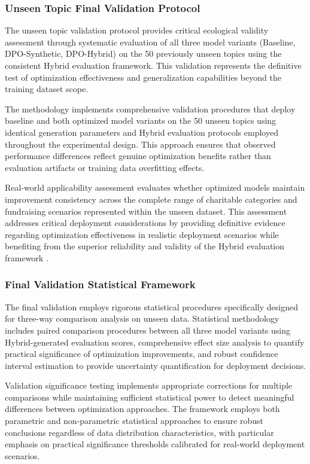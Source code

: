 \subsubsection{Unseen Topic Final Validation Protocol}

The unseen topic validation protocol provides critical ecological validity assessment through systematic evaluation of all three model variants (Baseline, DPO-Synthetic, DPO-Hybrid) on the 50 previously unseen topics using the consistent Hybrid evaluation framework. This validation represents the definitive test of optimization effectiveness and generalization capabilities beyond the training dataset scope.

The methodology implements comprehensive validation procedures that deploy baseline and both optimized model variants on the 50 unseen topics using identical generation parameters and Hybrid evaluation protocols employed throughout the experimental design. This approach ensures that observed performance differences reflect genuine optimization benefits rather than evaluation artifacts or training data overfitting effects.

Real-world applicability assessment evaluates whether optimized models maintain improvement consistency across the complete range of charitable categories and fundraising scenarios represented within the unseen dataset. This assessment addresses critical deployment considerations by providing definitive evidence regarding optimization effectiveness in realistic deployment scenarios while benefiting from the superior reliability and validity of the Hybrid evaluation framework \cite{lin2024meta_rewarding}.

\subsubsection{Final Validation Statistical Framework}

The final validation employs rigorous statistical procedures specifically designed for three-way comparison analysis on unseen data. Statistical methodology includes paired comparison procedures between all three model variants using Hybrid-generated evaluation scores, comprehensive effect size analysis to quantify practical significance of optimization improvements, and robust confidence interval estimation to provide uncertainty quantification for deployment decisions.

Validation significance testing implements appropriate corrections for multiple comparisons while maintaining sufficient statistical power to detect meaningful differences between optimization approaches. The framework employs both parametric and non-parametric statistical approaches to ensure robust conclusions regardless of data distribution characteristics, with particular emphasis on practical significance thresholds calibrated for real-world deployment scenarios.

